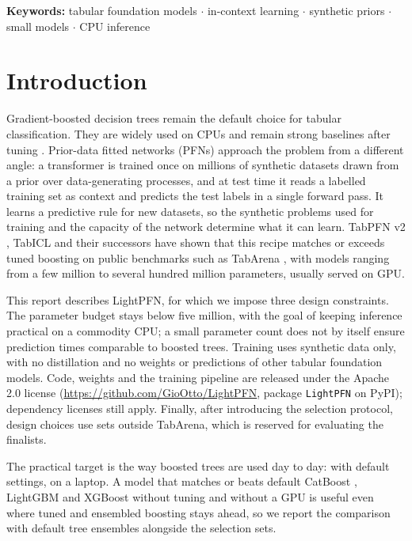 \documentclass[11pt]{article}
\begin{document}
\noindent\textbf{Keywords:} tabular foundation models $\cdot$ in-context learning $\cdot$ synthetic
priors $\cdot$ small models $\cdot$ CPU inference

\section{Introduction}

Gradient-boosted decision trees remain the default choice for tabular classification. They are
widely used on CPUs and remain strong baselines after tuning \cite{tabarena}. Prior-data fitted networks
(PFNs) \cite{muller2022,hollmann2023} approach the problem from a different angle: a transformer is
trained once on millions of synthetic datasets drawn from a prior over data-generating processes,
and at test time it reads a labelled training set as context and predicts the test labels in a
single forward pass. It learns a predictive rule for new datasets, so the synthetic problems used
for training and the capacity of the network determine what it can learn.
TabPFN v2 \cite{hollmann2025}, TabICL \cite{qu2025} and their successors have shown that this
recipe matches or exceeds tuned boosting on public benchmarks such as TabArena \cite{tabarena},
with models ranging from a few million to several hundred million parameters, usually served on
GPU.

This report describes LightPFN, for which we impose three design constraints. The parameter budget stays
below five million, with the goal of keeping inference practical on a commodity CPU; a small parameter
count does not by itself ensure prediction times comparable to boosted trees. Training uses synthetic data only,
with no distillation and no weights or predictions of other tabular foundation models. Code, weights and the
training pipeline are released under the Apache 2.0 license (\url{https://github.com/GioOtto/LightPFN}, package
\texttt{LightPFN} on PyPI); dependency licenses still apply. Finally, after
introducing the selection protocol, design choices use sets outside TabArena, which is reserved for
evaluating the finalists.

The practical target is the way boosted trees are used day to day: with default settings, on a
laptop. A model that matches or beats default CatBoost \cite{prokhorenkova2018}, LightGBM \cite{ke2017}
and XGBoost \cite{chen2016} without tuning and without
a GPU is useful even where tuned and ensembled boosting stays ahead, so we report the comparison with
default tree ensembles alongside the selection sets.
\end{document}
